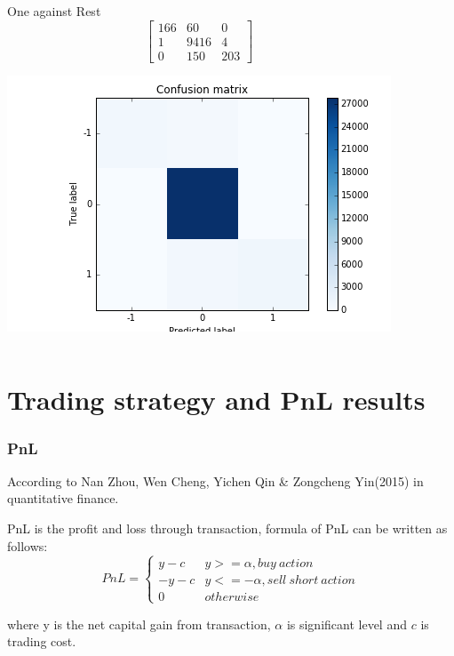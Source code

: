 \documentclass[xcolor={x11names,svgnames,dvipsnames}]{beamer}
\begin{document}
\begin{frame}
\begin{columns}
	\begin{block}{One against Rest}
\begin{equation*}       
\left[           
  \begin{array}{ccc}   
    166&    60 &    0\\  
     1& 9416& 4\\  
    0  & 150 & 203
  \end{array}
\right]               
\end{equation*}
\begin{center}
     \includegraphics[width=1\textwidth, height=0.45\textheight]{one_vs_rest.png}
\end{center}     
\end{block}
\end{columns}

\end{frame}


\section{Trading strategy and PnL results}

\begin{frame}
\frametitle{PnL}
According to Nan Zhou, Wen Cheng, Yichen Qin & Zongcheng Yin(2015) in quantitative finance.

PnL is the profit and loss through transaction, formula of PnL can be written as follows:\\
\begin{equation*}       
PnL=\left\{          
  \begin{array}{ll}   
    y-c  & y>=\alpha, buy\ action   \\  
     -y-c & y<=-\alpha, sell\ short\ action \\
     0 & otherwise
  \end{array}
\right.       
\end{equation*}

where y is the net capital gain from transaction, $\alpha$ is significant level and $c$ is trading cost.
\end{frame}
\end{document}
